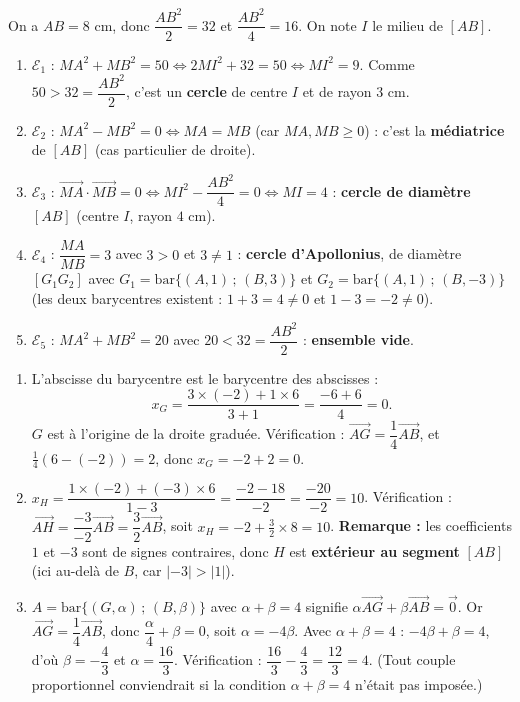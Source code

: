 \documentclass[11pt]{article}
\begin{document}
\begin{corrige}
On a $AB=8$ cm, donc $\dfrac{AB^2}{2}=32$ et $\dfrac{AB^2}{4}=16$. On note $I$ le milieu de $[AB]$.
\begin{enumerate}
\item $\mathcal{E}_1$ : $MA^2+MB^2=50\iff 2MI^2+32=50\iff MI^2=9$. Comme $50>32=\dfrac{AB^2}{2}$, c'est un \textbf{cercle} de centre $I$ et de rayon $3$ cm.
\item $\mathcal{E}_2$ : $MA^2-MB^2=0\iff MA=MB$ (car $MA,MB\ge 0$) : c'est la \textbf{médiatrice} de $[AB]$ (cas particulier de droite).
\item $\mathcal{E}_3$ : $\overrightarrow{MA}\cdot\overrightarrow{MB}=0\iff MI^2-\dfrac{AB^2}{4}=0\iff MI=4$ : \textbf{cercle de diamètre $[AB]$} (centre $I$, rayon $4$ cm).
\item $\mathcal{E}_4$ : $\dfrac{MA}{MB}=3$ avec $3>0$ et $3\neq 1$ : \textbf{cercle d'Apollonius}, de diamètre $[G_1G_2]$ avec $G_1=\mathrm{bar}\{(A,1)\,;\,(B,3)\}$ et $G_2=\mathrm{bar}\{(A,1)\,;\,(B,-3)\}$ (les deux barycentres existent : $1+3=4\neq 0$ et $1-3=-2\neq 0$).
\item $\mathcal{E}_5$ : $MA^2+MB^2=20$ avec $20<32=\dfrac{AB^2}{2}$ : \textbf{ensemble vide}.
\end{enumerate}
\end{corrige}

\begin{corrige}
\begin{enumerate}
\item L'abscisse du barycentre est le barycentre des abscisses :
\[ x_G=\dfrac{3\times(-2)+1\times 6}{3+1}=\dfrac{-6+6}{4}=0. \]
$G$ est à l'origine de la droite graduée. Vérification : $\overrightarrow{AG}=\dfrac{1}{4}\overrightarrow{AB}$, et $\frac14(6-(-2))=2$, donc $x_G=-2+2=0$.
\item $x_H=\dfrac{1\times(-2)+(-3)\times 6}{1-3}=\dfrac{-2-18}{-2}=\dfrac{-20}{-2}=10$.
Vérification : $\overrightarrow{AH}=\dfrac{-3}{-2}\overrightarrow{AB}=\dfrac32\overrightarrow{AB}$, soit $x_H=-2+\frac32\times 8=10$.
\textbf{Remarque :} les coefficients $1$ et $-3$ sont de signes contraires, donc $H$ est \textbf{extérieur au segment} $[AB]$ (ici au-delà de $B$, car $|-3|>|1|$).
\item $A=\mathrm{bar}\{(G,\alpha)\,;\,(B,\beta)\}$ avec $\alpha+\beta=4$ signifie $\alpha\overrightarrow{AG}+\beta\overrightarrow{AB}=\vec{0}$. Or $\overrightarrow{AG}=\dfrac14\overrightarrow{AB}$, donc $\dfrac{\alpha}{4}+\beta=0$, soit $\alpha=-4\beta$. Avec $\alpha+\beta=4$ : $-4\beta+\beta=4$, d'où $\beta=-\dfrac{4}{3}$ et $\alpha=\dfrac{16}{3}$. Vérification : $\dfrac{16}{3}-\dfrac{4}{3}=\dfrac{12}{3}=4$. (Tout couple proportionnel conviendrait si la condition $\alpha+\beta=4$ n'était pas imposée.)
\end{enumerate}
\end{corrige}
\end{document}
